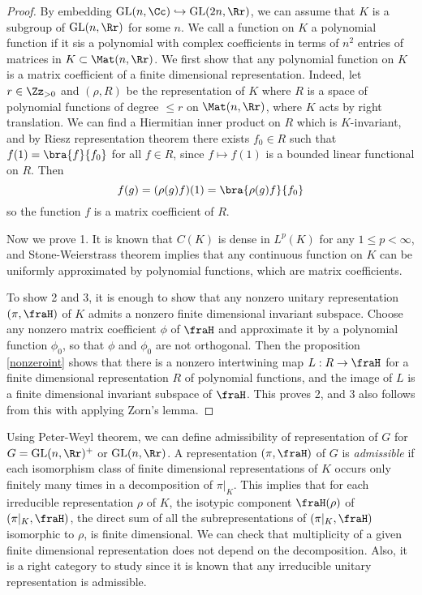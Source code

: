 \documentclass{article}
\newcommand{\GL}{\mathrm{GL}}
\begin{document}
\begin{proof}
By embedding $\GL(n, \Cc)\hookrightarrow \GL(2n, \Rr)$, we can assume that $K$ is a subgroup of $\GL(n, \Rr)$ for some $n$. We call a function on $K$ a polynomial function if it sis a polynomial with complex coefficients in terms of $n^{2}$ entries of matrices in $K\subset \Mat(n, \Rr)$. We first show that any polynomial function on $K$ is a matrix coefficient of a finite dimensional representation. 
Indeed, let $r\in \Zz_{>0}$ and $(\rho, R)$ be the representation of $K$ where $R$ is a space of polynomial functions of degree $\leq r$ on $\Mat(n, \Rr)$, where $K$ acts by right translation. 
We can find a Hiermitian inner product on $R$ which is $K$-invariant, and by Riesz representation theorem there exists $f_{0}\in R$ such that $f(1) = \bra{f}{f_{0}}$ for all $f\in R$, since $f\mapsto f(1)$ is a bounded linear functional on $R$. Then 
$$
f(g) = (\rho(g)f)(1) = \bra{\rho(g)f}{f_{0}}
$$
so the function $f$ is a matrix coefficient of $R$. 

Now we prove 1. It is known that $C(K)$ is dense in $L^{p}(K)$ for any $1\leq p <\infty$, and Stone-Weierstrass theorem implies that any continuous function on $K$ can be uniformly approximated by polynomial functions, which are matrix coefficients. 

To show 2 and 3, it is enough to show that any nonzero unitary representation $(\pi, \fraH)$ of $K$ admits a nonzero finite dimensional invariant subspace. 
Choose any nonzero matrix coefficient $\phi$ of $\fraH$ and approximate it by a polynomial function $\phi_{0}$, so that $\phi$ and $\phi_{0}$ are not orthogonal. Then the proposition \ref{nonzeroint} shows that there is a nonzero intertwining map $L:R\to \fraH$ for a finite dimensional representation $R$ of polynomial functions, and the image of $L$ is a finite dimensional invariant subspace of $\fraH$. 
This proves 2, and 3 also follows from this with applying Zorn's lemma. 
\end{proof}

Using Peter-Weyl theorem, we can define admissibility of representation of $G$ for $G = \GL(n, \Rr)^{+}$ or $\GL(n,\Rr)$. 
A representation $(\pi, \fraH)$ of $G$ is \emph{admissible} if each isomorphism class of finite dimensional representations of $K$ occurs only finitely many times in a decomposition of $\pi|_{K}$. 
This implies that for each irreducible representation $\rho$ of $K$, the isotypic component $\fraH(\rho)$ of $(\pi|_{K}, \fraH)$, the direct sum of all the subrepresentations of $(\pi|_{K}, \fraH)$ isomorphic to $\rho$, is finite dimensional. 
We can check that multiplicity of a given finite dimensional representation does not depend on the decomposition. 
Also, it is a right category to study since it is known that any irreducible unitary representation is admissible. 
\end{document}
